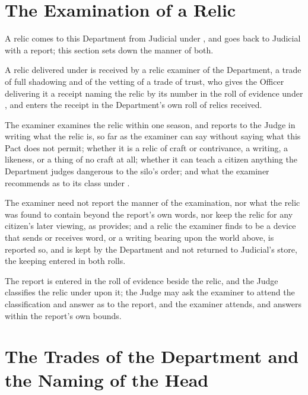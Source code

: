 \section{The Examination of a Relic}
\label{sec:it:examination-of-a-relic}

A relic comes to this Department from Judicial under , and goes back to Judicial with a report; this section sets down the manner of both.

\begin{clauses}
\item A relic delivered under  is received by a relic examiner of the Department, a trade of full shadowing and of the vetting of a trade of trust, who gives the Officer delivering it a receipt naming the relic by its number in the roll of evidence under , and enters the receipt in the Department's own roll of relics received.
\item The examiner examines the relic within one season, and reports to the Judge in writing what the relic is, so far as the examiner can say without saying what this Pact does not permit; whether it is a relic of craft or contrivance, a writing, a likeness, or a thing of no craft at all; whether it can teach a citizen anything the Department judges dangerous to the silo's order; and what the examiner recommends as to its class under .
\item The examiner need not report the manner of the examination, nor what the relic was found to contain beyond the report's own words, nor keep the relic for any citizen's later viewing, as  provides; and a relic the examiner finds to be a device that sends or receives word, or a writing bearing upon the world above, is reported so, and is kept by the Department and not returned to Judicial's store, the keeping entered in both rolls.
\item The report is entered in the roll of evidence beside the relic, and the Judge classifies the relic under  upon it; the Judge may ask the examiner to attend the classification and answer as to the report, and the examiner attends, and answers within the report's own bounds.
\end{clauses}

\section{The Trades of the Department and the Naming of the Head}
\label{sec:it:trades-of-the-department-and-the-naming-of-the-head}

